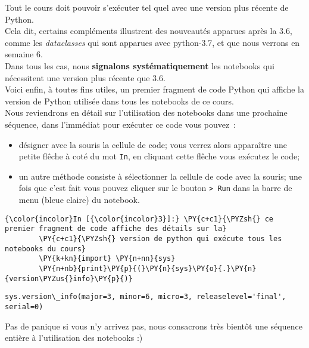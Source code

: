     Tout le cours doit pouvoir s'exécuter tel quel avec une version plus
récente de Python.\\

Cela dit, certains compléments illustrent des nouveautés apparues après
la 3.6, comme les \emph{dataclasses} qui sont apparues avec python-3.7,
et que nous verrons en semaine 6.\\

Dans tous les cas, nous \textbf{signalons systématiquement} les
notebooks qui nécessitent une version plus récente que 3.6.\\

    Voici enfin, à toutes fins utiles, un premier fragment de code Python
qui affiche la version de Python utilisée dans tous les notebooks de ce
cours.\\

Nous reviendrons en détail sur l'utilisation des notebooks dans une
prochaine séquence, dans l'immédiat pour exécuter ce code vous pouvez~:

\begin{itemize}
	\item 
	désigner avec la souris la cellule de code; vous verrez alors
	apparaître une petite flêche à coté du mot \texttt{In}, en cliquant
	cette flêche vous exécutez le code;
	\item
	un autre méthode consiste à
	sélectionner la cellule de code avec la souris; une fois que c'est fait
	vous pouvez cliquer sur le bouton \texttt{\textgreater{}\textbar{}\ Run}
	dans la barre de menu (bleue claire) du notebook.
\end{itemize}

    \begin{Verbatim}[commandchars=\\\{\}]
{\color{incolor}In [{\color{incolor}3}]:} \PY{c+c1}{\PYZsh{} ce premier fragment de code affiche des détails sur la}
        \PY{c+c1}{\PYZsh{} version de python qui exécute tous les notebooks du cours}
        \PY{k+kn}{import} \PY{n+nn}{sys}
        \PY{n+nb}{print}\PY{p}{(}\PY{n}{sys}\PY{o}{.}\PY{n}{version\PYZus{}info}\PY{p}{)}
\end{Verbatim}


    \begin{Verbatim}[commandchars=\\\{\}]
sys.version\_info(major=3, minor=6, micro=3, releaselevel='final', serial=0)

    \end{Verbatim}

    Pas de panique si vous n'y arrivez pas, nous consacrons très bientôt une
séquence entière à l'utilisation des notebooks :)